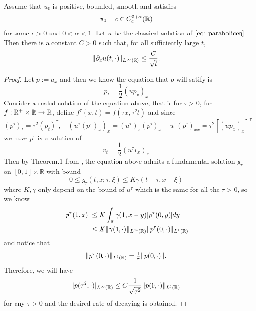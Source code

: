 \begin{theorem}\label{thm:bump-ux-decay}
    Assume that $u_0$ is positive, bounded, smooth and satisfies
    \[
        u_0-c\in C_c^{2+\alpha}(\mathbb{R})
    \]
    for some $c>0$ and $0<\alpha<1$. Let $u$ be the classical solution of $\eqref{eq: paraboliceq}$. Then there is a constant $C>0$ such that, for all sufficiently large $t$,
    \[
        \lVert \partial_x u(t,\cdot)\rVert_{L^{\infty}(\mathbb{R})}\leq \dfrac{C}{\sqrt{t}}.\label{ineq: squareroot-decay}
    \]
\end{theorem}
\begin{proof}
    Let $p:= u_x$ and then we know the equation that $p$ will satify is
    \[
    p_t = \dfrac{1}{2}(up_x)_x
    \]
    Consider a scaled solution of the equation above, that is for $\tau > 0$, for  $f:\mathbb{R}^+\times\mathbb{R}\to\mathbb{R}$, define $ f^{\tau}(x,t) = f(\tau x, \tau^2 t)$ and since
    \[
    (p^{\tau})_t = \tau^2 (p_t)^{\tau},\quad (u^{\tau}(p^{\tau})_x)_x = (u^{\tau})_x(p^{\tau})_x + u^{\tau}(p^{\tau})_{xx} = \tau^2[(up_x)_x]^{\tau}
    \]
    we have $p^{\tau}$ is a solution of
    \[
    v_t = \dfrac{1}{2}(u^{\tau}v_x)_x
    \]
    Then by Theorem.1 from \cite{Aronson1967}, the equation above admits a fundamental solution $g_{\tau}$ on $[0,1]\times\mathbb{R}$ with bound
    \[
    0\leq g_{\tau}(t,x;\tau,\xi) \leq K\gamma(t-\tau,x-\xi)
    \]
    where $K,\gamma$ only depend on the bound of $u^{\tau}$ which is the same for all the $\tau > 0$, so we know
    \[
    \begin{aligned} 
    |p^{\tau}(1,x)| &\leq K\int_{\mathbb{R}} \gamma(1,x-y)|p^{\tau}(0,y)|dy \\
    &\leq K\lVert \gamma(1,\cdot)\rVert_{L^{\infty}(\mathbb{R})} \lVert p^{\tau}(0,\cdot)\rVert_{L^1(\mathbb{R})}
     \end{aligned}
    \]
    and notice that
    \[
    \lVert p^{\tau}(0,\cdot)\rVert_{L^1(\mathbb{R})} = \tfrac{1}{\tau}\lVert p(0,\cdot)\rVert.
    \]
    Therefore, we will have
    \[
    |p(\tau^2,\cdot)|_{L^{\infty}(\mathbb{R})} \leq C\dfrac{1}{\sqrt{\tau^2 }}\lVert p(0,\cdot)\rVert_{L^1(\mathbb{R})}
    \]
    for any $\tau > 0$ and the desired rate of decaying is obtained.
\end{proof}

